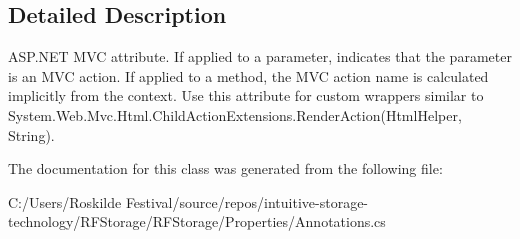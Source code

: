 \subsection{Detailed Description}
A\+S\+P.\+N\+ET M\+VC attribute. If applied to a parameter, indicates that the parameter is an M\+VC action. If applied to a method, the M\+VC action name is calculated implicitly from the context. Use this attribute for custom wrappers similar to {\ttfamily System.\+Web.\+Mvc.\+Html.\+Child\+Action\+Extensions.\+Render\+Action(\+Html\+Helper, String)}. 



The documentation for this class was generated from the following file\+:\begin{DoxyCompactItemize}
\item 
C\+:/\+Users/\+Roskilde Festival/source/repos/intuitive-\/storage-\/technology/\+R\+F\+Storage/\+R\+F\+Storage/\+Properties/Annotations.\+cs\end{DoxyCompactItemize}
